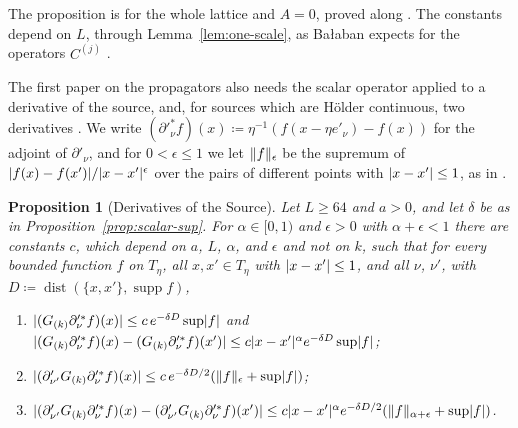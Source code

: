 \documentclass[11pt]{preprint}
\newcommand{\dist}{\operatorname{dist}}
\DeclarePairedDelimiter{\abs}{\lvert}{\rvert}
\DeclarePairedDelimiter{\norm}{\lVert}{\rVert}
\numberwithin{equation}{section}
\newtheorem{proposition}[theorem]{Proposition}
\theoremstyle{definition}
\theoremstyle{remark}
\theoremstyle{plain}
\begin{document}
The proposition is \cite[(1.9), (1.10)]{BalabanRDG} for the whole lattice and $A = 0$, proved along \cite[(2.38), (2.39)]{BalabanRDG}. The constants depend on $L$, through Lemma~\ref{lem:one-scale}, as Ba{\l}aban expects for the operators $C^{(j)}$ \cite[p.~588]{BalabanRDG}.

The first paper on the propagators also needs the scalar operator applied to a derivative of the source, and, for sources which are H\"older continuous, two derivatives \cite[(1.135)--(1.137), pp.~39--40]{BalabanPRT1}. We write $(\partial'^*_\nu f)(x) \coloneqq \eta^{-1}(f(x - \eta e'_\nu) - f(x))$ for the adjoint of $\partial'_\nu$, and for $0 < \epsilon \leq 1$ we let $\norm{f}_\epsilon$ be the supremum of $\abs{f(x) - f(x')}/\abs{x - x'}^\epsilon$ over the pairs of different points with $\abs{x - x'} \leq 1$, as in \cite[(1.109)]{BalabanPRT1}.

\begin{proposition}[Derivatives of the Source]\label{prop:scalar-second}
Let $L \geq 64$ and $a > 0$, and let $\delta$ be as in Proposition~\ref{prop:scalar-sup}. For $\alpha \in [0, 1)$ and $\epsilon > 0$ with $\alpha + \epsilon < 1$ there are constants $c$, which depend on $a$, $L$, $\alpha$, and $\epsilon$ and not on $k$, such that for every bounded function $f$ on $T_\eta$, all $x, x' \in T_\eta$ with $\abs{x - x'} \leq 1$, and all $\nu$, $\nu'$, with $D \coloneqq \dist(\{ x, x' \}, \operatorname{supp}f)$,
\begin{enumerate}[label=(\roman*)]
\item $\abs{(G_{(k)}\partial'^*_\nu f)(x)} \leq c\,e^{-\delta D}\sup\abs f$ and $\abs{(G_{(k)}\partial'^*_\nu f)(x) - (G_{(k)}\partial'^*_\nu f)(x')} \leq c\abs{x - x'}^\alpha e^{-\delta D}\sup\abs f$;
\item $\abs{(\partial'_{\nu'}G_{(k)}\partial'^*_\nu f)(x)} \leq c\,e^{-\delta D/2}(\norm{f}_\epsilon + \sup\abs f)$;
\item $\abs{(\partial'_{\nu'}G_{(k)}\partial'^*_\nu f)(x) - (\partial'_{\nu'}G_{(k)}\partial'^*_\nu f)(x')} \leq c\abs{x - x'}^\alpha e^{-\delta D/2}(\norm{f}_{\alpha+\epsilon} + \sup\abs f)$.
\end{enumerate}
\end{proposition}
\end{document}
